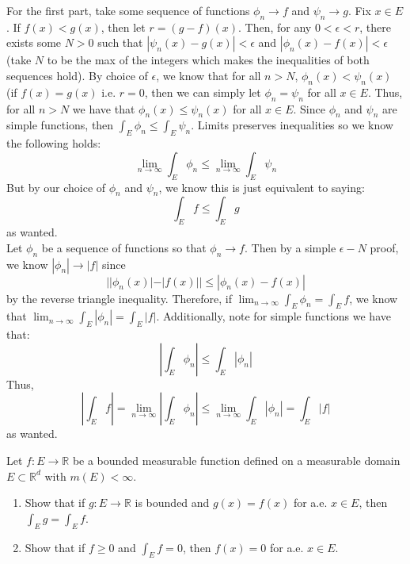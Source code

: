 \documentclass[12pt]{article}
\newcommand{\R}{\mathbb{R}}
\newenvironment{solution}[2][Solution]{\begin{trivlist}
\item[\hskip \labelsep {\bfseries #1}]}{\end{trivlist}}
\newenvironment{problem}[2][Problem]{\begin{trivlist}
\item[\hskip \labelsep {\bfseries #1}\hskip \labelsep {\bfseries #2.}]}{\end{trivlist}}
\begin{document}
\begin{solution}
    FFor the first part, take some sequence of functions $\phi_n \to f$ and $\psi_n \to g$. Fix $x\in E$. If $f(x) < g(x)$,
    then let $r = (g-f)(x)$. Then, for any $0 < \epsilon < r$, there exists some $N>0$ such that $|\psi_n(x) - g(x)|<\epsilon$
    and $|\phi_n(x) - f(x)|<\epsilon$ (take $N$ to be the max of the integers which makes the inequalities of both sequences hold).
    By choice of $\epsilon$, we know that for all $n>N$, $\phi_n(x) < \psi_n(x)$ (if $f(x)=g(x)$ i.e. $r = 0$, then we can simply
    let $\phi_n = \psi_n$ for all $x\in E$. Thus, for all $n>N$ we have that $\phi_n(x)\leq \psi_n(x)$ for all $x\in E$. Since
    $\phi_n$ and $\psi_n$ are simple functions, then $\int_E \phi_n \leq \int_E \psi_n$. Limits preserves inequalities so we
    know the following holds:
    \[ \lim_{n\to\infty} \int_E \phi_n \leq \lim_{n\to\infty} \int_E \psi_n \]
    But by our choice of $\phi_n$ and $\psi_n$, we know this is just equivalent to saying:
    \[ \int_E f \leq \int_E g \]
    as wanted.\\

    Let $\phi_n$ be a sequence of functions so that $\phi_n \to f$. Then by a simple $\epsilon-N$ proof, we know $|\phi_n|\to |f|$ since
    \[ ||\phi_n(x)|-|f(x)|| \leq |\phi_n(x) - f(x)|\]
    by the reverse triangle inequality. Therefore, if $\lim_{n\to\infty} \int_E \phi_n = \int_E f$, we know that
    $\lim_{n\to\infty} \int_E |\phi_n| = \int_E |f|$. Additionally, note for simple functions we have that:
    \[ |\int_E \phi_n| \leq \int_E |\phi_n| \]
    Thus,
    \[ |\int_E f| = \lim_{n\to\infty} |\int_E \phi_n| \leq \lim_{n\to\infty} \int_E |\phi_n| = \int_E |f| \]
    as wanted.
    
\end{solution}
\pagebreak

\begin{problem}{4}
    Let $f:E\to\R$ be a bounded measurable function defined on a measurable domain $E\subset\R^d$ with $m(E)<\infty$.
    \begin{enumerate}
        \item Show that if $g:E\to\R$ is bounded and $g(x)=f(x)$ for a.e. $x\in E$, then $\int_E g = \int_E f$.
        \item Show that if $f\geq 0$ and $\int_E f = 0$, then $f(x) = 0$ for a.e. $x\in E$.
    \end{enumerate}
\end{problem}
\end{document}
